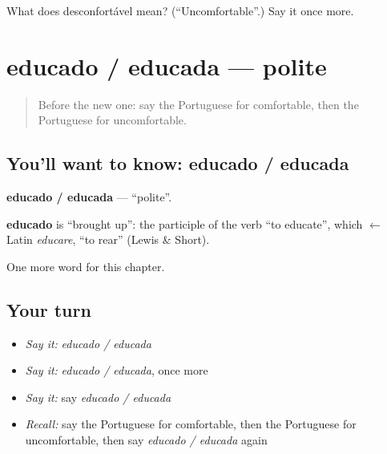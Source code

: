 \begin{tcolorbox}[breakable,colback=teal!4,colframe=teal!35!black,title={Before you move on}]
What does desconfortável mean? (\textquotedblleft{}Uncomfortable\textquotedblright{}.) Say it once more.
\end{tcolorbox}
\section[educado / educada]{educado / educada — polite}

\label{lesson:PT-C153-educado-educada}



\begin{quote}
Before the new one: say the Portuguese for comfortable, then the Portuguese for uncomfortable.
\end{quote}

\subsection*{You'll want to know: educado / educada}
\textbf{educado / educada} — \textquotedblleft{}polite\textquotedblright{}.

\begin{cousinweb}
\textbf{educado} is \textquotedblleft{}brought up\textquotedblright{}: the participle of the verb \textquotedblleft{}to educate\textquotedblright{}, which $\leftarrow$ Latin \emph{educare}, \textquotedblleft{}to rear\textquotedblright{} (Lewis \& Short).
\end{cousinweb}

\begin{grammarlens}[title={What you've built}]
One more word for this chapter.
\end{grammarlens}

\subsection*{Your turn}
\begin{itemize}
\raggedright
  \item \emph{Say it:} \emph{educado / educada}
  \item \emph{Say it:} \emph{educado / educada}, once more
  \item \emph{Say it:} say \emph{educado / educada}
  \item \emph{Recall:} say the Portuguese for comfortable, then the Portuguese for uncomfortable, then say \emph{educado / educada} again
\end{itemize}

